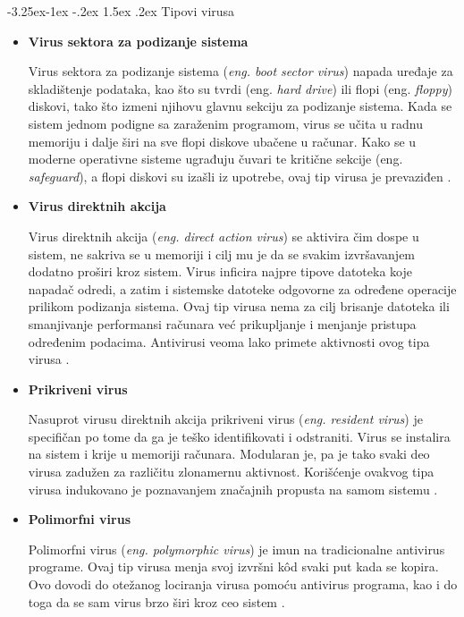 \documentclass[a4paper]{article}
\makeatletter
\renewcommand\paragraph{\@startsection{paragraph}{4}{\z@}%
   {-3.25ex\@plus -1ex \@minus -.2ex}%
   {1.5ex \@plus .2ex}%
   {\normalfont\normalsize\bfseries}}
\makeatother
\begin{document}
\paragraph{Tipovi virusa}
\begin{itemize}
\item \textbf{Virus sektora za podizanje sistema}

Virus sektora za podizanje sistema (\textit{eng. boot sector virus}) napada uređaje za skladištenje podataka, kao što su tvrdi (eng. \textit{hard drive}) ili flopi (eng. \textit{floppy}) diskovi, tako što izmeni njihovu glavnu sekciju za podizanje sistema. Kada se sistem jednom podigne sa zaraženim programom, virus se učita u radnu memoriju i dalje širi na sve flopi diskove ubačene u računar. Kako se u moderne operativne sisteme ugrađuju čuvari te kritične sekcije (eng. \textit{safeguard}), a flopi diskovi su izašli iz upotrebe, ovaj tip virusa je prevaziđen \cite{viruses_and_worms, computer_virus}.


\item \textbf{Virus direktnih akcija}

Virus direktnih akcija (\textit{eng. direct action virus}) se aktivira čim dospe u sistem, ne sakriva se u memoriji i cilj mu je da se svakim izvršavanjem dodatno proširi kroz sistem. Virus inficira najpre tipove datoteka koje napadač odredi, a zatim i sistemske datoteke odgovorne za određene operacije prilikom podizanja sistema. Ovaj tip virusa nema za cilj brisanje datoteka ili smanjivanje performansi računara već prikupljanje i menjanje pristupa određenim podacima. Antivirusi veoma lako primete aktivnosti ovog tipa virusa \cite{directaction}.


\item \textbf{Prikriveni virus}

Nasuprot virusu direktnih akcija prikriveni virus (\textit{eng. resident virus}) je specifičan po tome da ga je teško identifikovati i odstraniti. Virus se instalira na sistem i krije u memoriji računara. Modularan je, pa je tako svaki deo virusa zadužen za različitu zlonamernu aktivnost. Korišćenje ovakvog tipa virusa indukovano je poznavanjem značajnih propusta na samom sistemu \cite{computer_virus}.

\item \textbf{Polimorfni virus}

Polimorfni virus (\textit{eng. polymorphic virus}) je imun na tradicionalne antivirus programe. Ovaj tip virusa menja svoj izvršni kôd svaki put kada se kopira. Ovo dovodi do otežanog lociranja virusa pomoću antivirus programa, kao i do toga da se sam virus brzo širi kroz ceo sistem \cite{computer_virus}.


\end{itemize}
\end{document}
